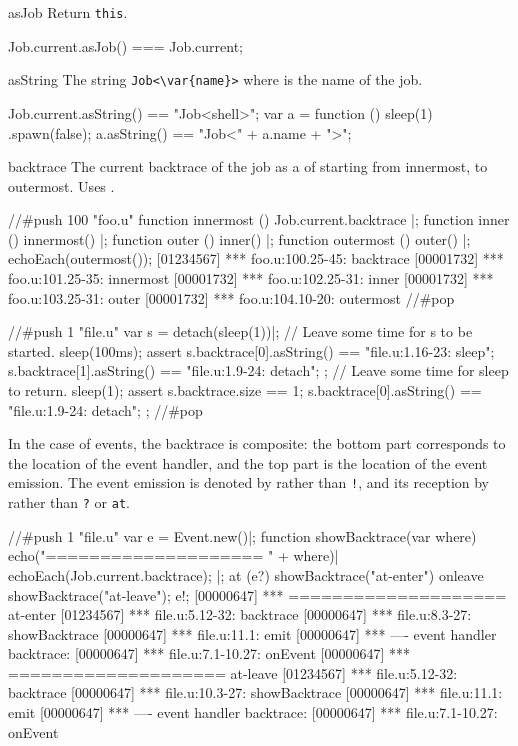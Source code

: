 \begin{urbiscriptapi}
\item[asJob]
  Return \lstinline|this|.
\begin{urbiassert}
Job.current.asJob() === Job.current;
\end{urbiassert}


\item[asString] The string \lstinline|Job<\var{name}>| where  is
  the name of the job.
\begin{urbiassert}
Job.current.asString() == "Job<shell>";
var a = function () { sleep(1) }.spawn(false);
a.asString() == "Job<" + a.name + ">";
\end{urbiassert}


\item[backtrace] The current backtrace of the job as a  of
   starting from innermost, to outermost.
  Uses .

\begin{urbiscript}
//#push 100 "foo.u"
function innermost () { Job.current.backtrace }|;
function inner ()     { innermost() }|;
function outer ()     { inner() }|;
function outermost () { outer() }|;
echoEach(outermost());
[01234567] *** foo.u:100.25-45: backtrace
[00001732] *** foo.u:101.25-35: innermost
[00001732] *** foo.u:102.25-31: inner
[00001732] *** foo.u:103.25-31: outer
[00001732] *** foo.u:104.10-20: outermost
//#pop

//#push 1 "file.u"
var s = detach(sleep(1))|;
// Leave some time for s to be started.
sleep(100ms);
assert
{
  s.backtrace[0].asString() == "file.u:1.16-23: sleep";
  s.backtrace[1].asString() == "file.u:1.9-24: detach";
};
// Leave some time for sleep to return.
sleep(1);
assert
{
  s.backtrace.size == 1;
  s.backtrace[0].asString() == "file.u:1.9-24: detach";
};
//#pop
\end{urbiscript}

  In the case of events, the backtrace is composite: the bottom part
  corresponds to the location of the event handler, and the top part is the
  location of the event emission.  The event emission is denoted by
   rather than \lstinline|!|, and its reception by
   rather than \lstinline|?| or \lstinline|at|.

\begin{urbiscript}
//#push 1 "file.u"
var e = Event.new()|;
function showBacktrace(var where)
{
  echo("==================== " + where)|
  echoEach(Job.current.backtrace);
}|;
at (e?)
  showBacktrace("at-enter")
onleave
  showBacktrace("at-leave");
e!;
[00000647] *** ==================== at-enter
[01234567] *** file.u:5.12-32: backtrace
[00000647] *** file.u:8.3-27: showBacktrace
[00000647] *** file.u:11.1: emit
[00000647] *** ---- event handler backtrace:
[00000647] *** file.u:7.1-10.27: onEvent
[00000647] *** ==================== at-leave
[01234567] *** file.u:5.12-32: backtrace
[00000647] *** file.u:10.3-27: showBacktrace
[00000647] *** file.u:11.1: emit
[00000647] *** ---- event handler backtrace:
[00000647] *** file.u:7.1-10.27: onEvent



\end{urbiscript}
\end{urbiscriptapi}
